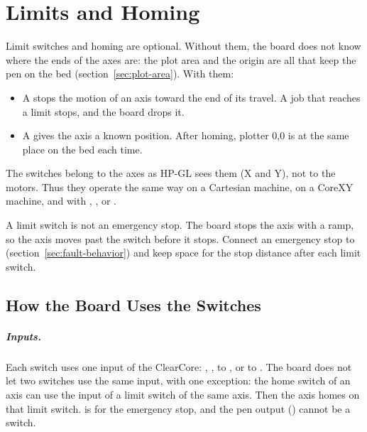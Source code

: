 \chapter{Limits and Homing}\label{ch:limits}

Limit switches and homing are optional. Without them, the board does not know
where the ends of the axes are: the plot area and the origin are all that keep
the pen on the bed (section~\ref{sec:plot-area}). With them:

\begin{itemize}
  \item A  stops the motion of an axis toward the end of
        its travel. A job that reaches a limit stops, and the board drops it.
  \item A  gives the axis a known position. After homing,
        plotter 0,0 is at the same place on the bed each time.
\end{itemize}

The switches belong to the axes as HP-GL sees them (X and Y), not to the
motors. Thus they operate the same way on a Cartesian machine, on a CoreXY
machine, and with , , or .

\begin{warning}
A limit switch is not an emergency stop. The board stops the axis with a
ramp, so the axis moves past the switch before it stops. Connect an emergency
stop to  (section~\ref{sec:fault-behavior}) and keep space for the stop
distance after each limit switch.
\end{warning}

\section{How the Board Uses the Switches}\label{sec:switch-rules}

\paragraph{Inputs.} Each switch uses one input of the ClearCore:
, ,  to , or  to
. The board does not let two switches use the same input, with one
exception: the home switch of an axis can use the input of a limit switch of
the same axis. Then the axis homes on that limit switch.  is for the
emergency stop, and the pen output () cannot be a switch.

